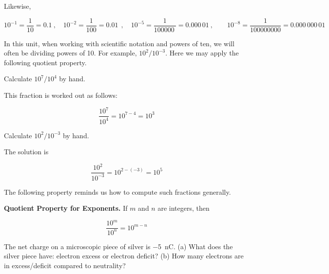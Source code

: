 \documentclass[dvipsnames]{article}
\numberwithin{equation}{section}
\numberwithin{figure}{section}
\begin{document}
Likewise,

\begin{equation*}
    10^{-1} = \frac{1}{10} = 0.1\ , \quad
    10^{-2} = \frac{1}{100} = \SI{0.01}{}\ , \quad 
    10^{-5} = \frac{1}{\SI{100000}{}} = 0.000\,01\ ,\qquad
    10^{-8} = \frac{1}{\num{100000000}} = 0.000\,000\,01
\end{equation*}

In this unit, when working with scientific notation and powers of ten, we will often be dividing powers of 10. For example, $10^2/10^{-3}$. Here we may apply the following quotient property.


\begin{example}
    Calculate $10^7/10^4$ by hand.
\end{example}

\Solution This fraction is worked out as follows:

\begin{equation*}
    \frac{10^7}{10^4} = 10^{7-4} = 10^3
\end{equation*}

\begin{example}
    Calculate $10^2/10^{-3}$ by hand.
\end{example}

\Solution The solution is

\begin{equation*}
    \frac{10^2}{10^{-3}} = 10^{2 - (-3)} = 10^5
\end{equation*}

\cyanhrule
\vspace{1em}

The following property reminds us how to compute such fractions generally.

\begin{mdframed}[backgroundcolor=black!10]
    \textbf{Quotient Property for Exponents.} If $m$ and $n$ are integers, then

    \begin{equation} \label{6Kyqsn}
        \frac{10^m}{10^n} = 10^{m-n}
    \end{equation}
\end{mdframed}







\begin{example}
    The net charge on a microscopic piece of silver is \SI{-5}{nC}. (a) What does the silver piece have: electron excess or electron deficit? (b) How many electrons are in excess/deficit compared to neutrality?
\end{example}
\end{document}
